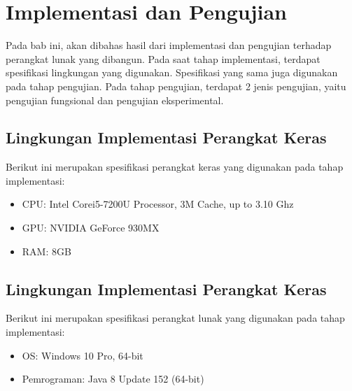 \chapter{Implementasi dan Pengujian}
Pada bab ini, akan dibahas hasil dari implementasi dan pengujian terhadap perangkat lunak yang dibangun. Pada saat tahap implementasi, terdapat spesifikasi lingkungan yang digunakan. Spesifikasi yang sama juga digunakan pada tahap pengujian. Pada tahap pengujian, terdapat 2 jenis pengujian, yaitu pengujian fungsional dan pengujian eksperimental.

\section{Lingkungan Implementasi Perangkat Keras}
Berikut ini merupakan spesifikasi perangkat keras yang digunakan pada tahap implementasi:
\begin{itemize}
	\item CPU: Intel\textsuperscript{\textregistered}{ }Core\texttrademark{ }i5-7200U Processor, 3M Cache, up to 3.10 Ghz
	\item GPU: NVIDIA GeForce 930MX
	\item RAM: 8GB
\end{itemize}

\section{Lingkungan Implementasi Perangkat Keras}
Berikut ini merupakan spesifikasi perangkat lunak yang digunakan pada tahap implementasi:
\begin{itemize}
	\item OS: Windows 10 Pro, 64-bit
	\item Pemrograman: Java 8 Update 152 (64-bit)
\end{itemize}

